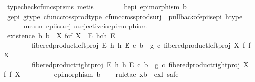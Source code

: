 \begin{isabellebody}
\ {\isacharparenleft}{\kern0pt}typecheck{\isacharunderscore}{\kern0pt}cfuncs{\isacharunderscore}{\kern0pt}prems{\isacharcomma}{\kern0pt}\ metis{\isacharparenright}{\kern0pt}\isanewline
\ \ \isamarkupfalse%
\isanewline
\ \ \isamarkupfalse%
\ \isamarkupfalse%
\ b{\isacharunderscore}{\kern0pt}epi{\isacharcolon}{\kern0pt}\ {\isachardoublequoteopen}epimorphism\ b{\isachardoublequoteclose}\isanewline
\ \ \ \ \isamarkupfalse%
\ g{\isacharunderscore}{\kern0pt}epi\ g{\isacharunderscore}{\kern0pt}type\ cfunc{\isacharunderscore}{\kern0pt}cross{\isacharunderscore}{\kern0pt}prod{\isacharunderscore}{\kern0pt}type\ cfunc{\isacharunderscore}{\kern0pt}cross{\isacharunderscore}{\kern0pt}prod{\isacharunderscore}{\kern0pt}surj\ \ pullback{\isacharunderscore}{\kern0pt}of{\isacharunderscore}{\kern0pt}epi{\isacharunderscore}{\kern0pt}is{\isacharunderscore}{\kern0pt}epi{}\ h{\isacharunderscore}{\kern0pt}type\isanewline
\ \ \ \ \isamarkupfalse%
\ {\isacharparenleft}{\kern0pt}meson\ epi{\isacharunderscore}{\kern0pt}is{\isacharunderscore}{\kern0pt}surj\ surjective{\isacharunderscore}{\kern0pt}is{\isacharunderscore}{\kern0pt}epimorphism{\isacharparenright}{\kern0pt}\isanewline
\isanewline
\ \ \isamarkupfalse%
\ existence{\isacharcolon}{\kern0pt}\ {\isachardoublequoteopen}{\isasymexists}b{\isachardot}{\kern0pt}\ b\ {\isacharcolon}{\kern0pt}\ X\ \isactrlbsub f\isactrlesub {\isasymtimes}\isactrlsub c\isactrlbsub f\isactrlesub \ X\ {\isasymrightarrow}\ E\ \isactrlbsub h\isactrlesub {\isasymtimes}\isactrlsub c\isactrlbsub h\isactrlesub \ E\ {\isasymand}\isanewline
\ \ \ \ \ \ \ \ fibered{\isacharunderscore}{\kern0pt}product{\isacharunderscore}{\kern0pt}left{\isacharunderscore}{\kern0pt}proj\ E\ h\ h\ E\ {\isasymcirc}\isactrlsub c\ b\ {\isacharequal}{\kern0pt}\ g\ {\isasymcirc}\isactrlsub c\ fibered{\isacharunderscore}{\kern0pt}product{\isacharunderscore}{\kern0pt}left{\isacharunderscore}{\kern0pt}proj\ X\ f\ f\ X\ {\isasymand}\isanewline
\ \ \ \ \ \ \ \ fibered{\isacharunderscore}{\kern0pt}product{\isacharunderscore}{\kern0pt}right{\isacharunderscore}{\kern0pt}proj\ E\ h\ h\ E\ {\isasymcirc}\isactrlsub c\ b\ {\isacharequal}{\kern0pt}\ g\ {\isasymcirc}\isactrlsub c\ fibered{\isacharunderscore}{\kern0pt}product{\isacharunderscore}{\kern0pt}right{\isacharunderscore}{\kern0pt}proj\ X\ f\ f\ X\ {\isasymand}\isanewline
\ \ \ \ \ \ \ \ epimorphism\ b{\isachardoublequoteclose}\isanewline
\ \ \isamarkupfalse%
\ {\isacharparenleft}{\kern0pt}rule{\isacharunderscore}{\kern0pt}tac\ x{\isacharequal}{\kern0pt}b\ \ exI{\isacharcomma}{\kern0pt}\ safe{\isacharparenright}{\kern0pt}\isanewline

\end{isabellebody}
